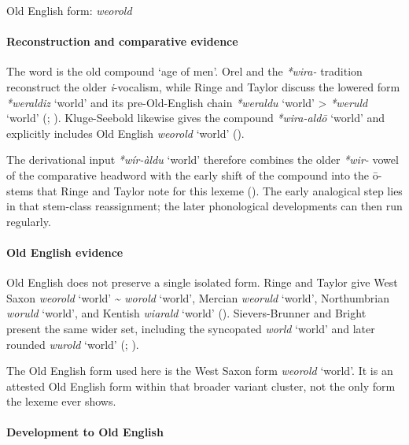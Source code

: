 \documentclass[
  british,
  a4paper,
]{article}
\providecommand{\Recon}[1]{\emph{*#1}}
\begin{document}
Old English form: \emph{weorold}

\paragraph{Reconstruction and comparative
evidence}\label{reconstruction-and-comparative-evidence-115}

The word is the old compound `age of men'. Orel and the \emph{*wira-}
tradition reconstruct the older \emph{i}-vocalism, while Ringe and
Taylor discuss the lowered form \Recon{weraldiz} `world' and its
pre-Old-English chain \Recon{weraldu} `world' \textgreater{}
\Recon{weruld} `world' (;
).
Kluge-Seebold likewise gives the compound \Recon{wira-aldō} `world' and
explicitly includes Old English \emph{weorold} `world'
().

The derivational input \Recon{wír-àldu} `world' therefore combines the
older \emph{*wir-} vowel of the comparative headword with the early
shift of the compound into the ō-stems that Ringe and Taylor note for
this lexeme (). The early analogical step lies in that stem-class reassignment;
the later phonological developments can then run regularly.

\paragraph{Old English evidence}\label{old-english-evidence-115}

Old English does not preserve a single isolated form. Ringe and Taylor
give West Saxon {\emph{weorold}} `world' \textasciitilde{}
{\emph{worold}} `world', Mercian {\emph{weoruld}} `world', Northumbrian
{\emph{woruld}} `world', and Kentish {\emph{wiarald}} `world'
().
Sievers-Brunner and Bright present the same wider set, including the
syncopated {\emph{world}} `world' and later rounded {\emph{wurold}}
`world' (;
).

The Old English form used here is the West Saxon form {\emph{weorold}}
`world'. It is an attested Old English form within that broader variant
cluster, not the only form the lexeme ever shows.

\paragraph{Development to Old
English}\label{development-to-old-english-115}
\end{document}
